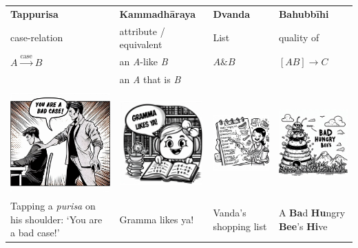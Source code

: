 \documentclass[11pt,oneside]{memoir}
\begin{document}
\begin{longtable}{L{4cm} L{4cm} L{4cm} L{4cm}}
\textbf{Tappurisa} & \textbf{Kammadhāraya} & \textbf{Dvanda} & \textbf{Bahubbīhi}\\
case-relation & attribute / equivalent & List & quality of\\
\(A \xrightarrow{\text{case}} B\) & an \emph{A}-like \emph{B} & \(A \mathbin{\&} B\) & \([A B] \rightarrow C\)\\
 & an \emph{A} that is \emph{B} &  & \\
 &  &  & \\
\includegraphics[width=4cm]{./images/tapping-bad-case.jpeg} & \includegraphics[width=4cm]{./images/gramma-likes-ya.jpeg} & \includegraphics[width=4cm]{./images/vandas-shopping-list.jpeg} & \includegraphics[width=4cm]{./images/bad-hungry-bees-hive.jpeg}\\
Tapping a \emph{purisa} on his shoulder: `You are a bad case!' & Gramma likes ya! & Vanda's shopping list & A \textbf{Ba}d \textbf{Hu}ngry \textbf{Bee}'s \textbf{Hi}ve\\

\end{longtable}
\end{document}

